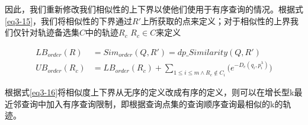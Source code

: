因此，我们重新修改我们相似性的上下界以使他们使用于有序查询的情况。根据式\ref{eq3-15}，我们将相似性的下界通过$R'$上所获取的点来定义；对于相似性的上界我们仅针对轨迹备选集$C$中的轨迹$R_c$ $R_c \in C$来定义

\begin{equation}
\label{eq3-16}
\begin{split}
LB_{order}(R) & = Sim_{order}(Q, R') = dp\_Similarity(Q,R')\\
UB_{order}(R_c) & = LB_{order}(R_c) + \sum_{1\leq i\leq m\wedge R_c\notin C_i}\big( e^{-D_{e}(q_i, p_i^\lambda)} \big)
\end{split}
\end{equation}

根据式\ref{eq3-16}将相似度上下界从无序的定义改成有序的定义，则可以在增长型k最近邻查询中加入有序查询限制，即根据查询点集的查询顺序查询最相似的k的轨迹。

